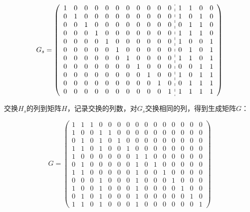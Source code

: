 \documentclass[12pt, a4paper]{ctexart}
\begin{document}
    $$G_s = 
    \left(\begin{array}{ccccccccccc:cccc}
        1 & 0 & 0 & 0 & 0 & 0 & 0 & 0 & 0 & 0 & 0 & 1 & 1 & 0 & 0 \\
        0 & 1 & 0 & 0 & 0 & 0 & 0 & 0 & 0 & 0 & 0 & 1 & 0 & 1 & 0 \\
        0 & 0 & 1 & 0 & 0 & 0 & 0 & 0 & 0 & 0 & 0 & 0 & 1 & 1 & 0 \\
        0 & 0 & 0 & 1 & 0 & 0 & 0 & 0 & 0 & 0 & 0 & 1 & 1 & 1 & 0 \\
        0 & 0 & 0 & 0 & 1 & 0 & 0 & 0 & 0 & 0 & 0 & 1 & 0 & 0 & 1 \\
        0 & 0 & 0 & 0 & 0 & 1 & 0 & 0 & 0 & 0 & 0 & 0 & 1 & 0 & 1 \\
        0 & 0 & 0 & 0 & 0 & 0 & 1 & 0 & 0 & 0 & 0 & 1 & 1 & 0 & 1 \\
        0 & 0 & 0 & 0 & 0 & 0 & 0 & 1 & 0 & 0 & 0 & 0 & 0 & 1 & 1 \\
        0 & 0 & 0 & 0 & 0 & 0 & 0 & 0 & 1 & 0 & 0 & 1 & 0 & 1 & 1 \\
        0 & 0 & 0 & 0 & 0 & 0 & 0 & 0 & 0 & 1 & 0 & 0 & 1 & 1 & 1 \\
        0 & 0 & 0 & 0 & 0 & 0 & 0 & 0 & 0 & 0 & 1 & 1 & 1 & 1 & 1 
    \end{array}\right)
    $$

    交换$H_s$的列到矩阵$H$，记录交换的列数，对$G_s$交换相同的列，得到生成矩阵$G$：
    
    $$G = 
    \begin{pmatrix}
        1 & 1 & 1 & 0 & 0 & 0 & 0 & 0 & 0 & 0 & 0 & 0 & 0 & 0 & 0 \\
        1 & 0 & 0 & 1 & 1 & 0 & 0 & 0 & 0 & 0 & 0 & 0 & 0 & 0 & 0 \\
        0 & 1 & 0 & 1 & 0 & 1 & 0 & 0 & 0 & 0 & 0 & 0 & 0 & 0 & 0 \\
        1 & 1 & 0 & 1 & 0 & 0 & 1 & 0 & 0 & 0 & 0 & 0 & 0 & 0 & 0 \\
        1 & 0 & 0 & 0 & 0 & 0 & 0 & 1 & 1 & 0 & 0 & 0 & 0 & 0 & 0 \\
        0 & 1 & 0 & 0 & 0 & 0 & 0 & 1 & 0 & 1 & 0 & 0 & 0 & 0 & 0 \\
        1 & 1 & 0 & 0 & 0 & 0 & 0 & 1 & 0 & 0 & 1 & 0 & 0 & 0 & 0 \\
        0 & 0 & 0 & 1 & 0 & 0 & 0 & 1 & 0 & 0 & 0 & 1 & 0 & 0 & 0 \\
        1 & 0 & 0 & 1 & 0 & 0 & 0 & 1 & 0 & 0 & 0 & 0 & 1 & 0 & 0 \\
        0 & 1 & 0 & 1 & 0 & 0 & 0 & 1 & 0 & 0 & 0 & 0 & 0 & 1 & 0 \\
        1 & 1 & 0 & 1 & 0 & 0 & 0 & 1 & 0 & 0 & 0 & 0 & 0 & 0 & 1 
    \end{pmatrix}
    $$
\end{document}
